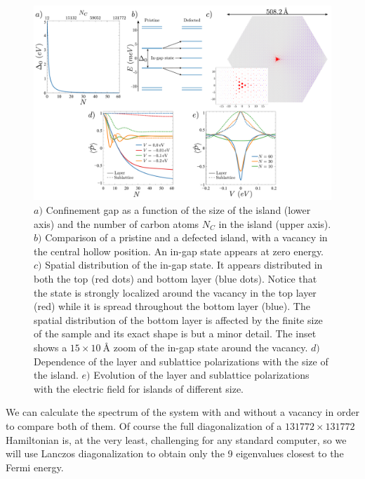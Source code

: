 \begin{figure}[!ht!]
\centering
\includegraphics[width=\textwidth]{artlat/fig/confinement.pdf}
\vspace{-20pt}
\caption{$a)$ Confinement gap as a function of the size of the island (lower axis) and the number of carbon atoms $N_C$ in the island (upper axis). $b)$ Comparison of a pristine and a defected island, with a vacancy in the central hollow position. An in-gap state appears at zero energy. $c)$ Spatial distribution of the in-gap state. It appears distributed in both the top (red dots) and bottom layer (blue dots). Notice that the state is strongly localized around the vacancy in the top layer (red) while it is spread throughout the bottom layer (blue). The spatial distribution of the bottom layer is affected by the finite size of the sample and its exact shape is but a minor detail. The inset shows a $15\times\SI{10}{\angstrom}$ zoom of the in-gap state around the vacancy. $d)$ Dependence of the layer and sublattice polarizations with the size of the island. $e)$ Evolution of the layer and sublattice polarizations with the electric field for islands of different size.}
\label{confinement}
\end{figure}

We can calculate the spectrum of the system with and without a vacancy in order to compare both of them. Of course the full diagonalization of a $131772\times131772$ Hamiltonian is, at the very least, challenging for any standard computer, so we will use Lanczos diagonalization\cite{Lanczos1950, Ojalvo1970, Arnoldi1951} to obtain only the 9 eigenvalues closest to the Fermi energy.

